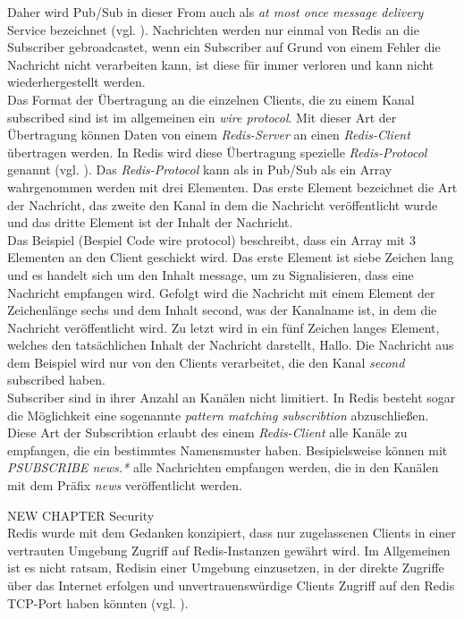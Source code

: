 Daher wird \acs{Pub/Sub} in dieser From auch als \textit{at most once message delivery} Service bezeichnet (vgl. \cite{Redis-PubSub}). Nachrichten werden nur einmal von \acs{Redis} an die Subscriber gebroadcastet, wenn ein Subscriber auf Grund von einem Fehler die Nachricht nicht verarbeiten kann, ist diese für immer verloren und kann nicht wiederhergestellt werden. 
\\
Das Format der Übertragung an die einzelnen Clients, die zu einem Kanal subscribed sind ist im allgemeinen ein \textit{wire protocol}. Mit dieser Art der Übertragung können Daten von einem \textit{Redis-Server} an einen \textit{Redis-Client} übertragen werden.
In \acs{Redis} wird diese Übertragung spezielle \textit{Redis-Protocol} genannt (vgl. \cite{Redis-PubSub}).
Das \textit{Redis-Protocol} kann als in \acs{Pub/Sub} als ein Array wahrgenommen werden mit drei Elementen. Das erste Element bezeichnet die Art der Nachricht, das zweite den Kanal in dem die Nachricht veröffentlicht wurde und das dritte Element ist der Inhalt der Nachricht. 
\\
Das Beispiel (Bespiel Code wire protocol) beschreibt, dass ein Array mit 3 Elementen an den Client geschickt wird. Das erste Element ist siebe Zeichen lang und es handelt sich um den Inhalt message, um zu Signalisieren, dass eine Nachricht empfangen wird. Gefolgt wird die Nachricht mit einem Element der Zeichenlänge sechs und dem Inhalt second, was der Kanalname ist, in dem die Nachricht veröffentlicht wird. Zu letzt wird in ein fünf Zeichen langes Element, welches den tatsächlichen Inhalt der Nachricht darstellt, \glqq Hallo\grqq.
Die Nachricht aus dem Beispiel wird nur von den Clients verarbeitet, die den Kanal \textit{second} subscribed haben.
\\
Subscriber sind in ihrer Anzahl an Kanälen nicht limitiert. In \acs{Redis} besteht sogar die Möglichkeit eine sogenannte \textit{pattern matching subscribtion} abzuschließen. Diese Art der Subscribtion erlaubt des einem \textit{Redis-Client} alle Kanäle zu empfangen, die ein bestimmtes Namensmuster haben. Besipielsweise können mit \textit{PSUBSCRIBE news.*} alle Nachrichten empfangen werden, die in den Kanälen mit dem Präfix \textit{news} veröffentlicht werden.


NEW CHAPTER Security
\\
\acs{Redis} wurde mit dem Gedanken konzipiert, dass nur zugelassenen Clients in einer vertrauten Umgebung  Zugriff auf \acs{Redis}-Instanzen gewährt wird. 
Im Allgemeinen ist es nicht ratsam, \acs{Redis}in einer Umgebung einzusetzen, in der direkte Zugriffe über das Internet erfolgen und unvertrauenswürdige Clients Zugriff auf den \acs{Redis} TCP-Port haben könnten (vgl. \cite{Redis-Security}).

